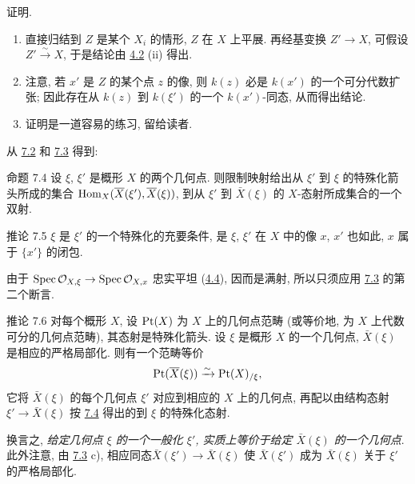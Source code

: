 证明.
\begin{enumerate}
\renewcommand{\theenumi}{\alph{enumi}}
\renewcommand{\labelenumi}{\theenumi)}
\item 直接归结到 $Z$ 是某个 $X_{i}$ 的情形,
\ie $Z$ 在 $X$ 上平展.
再经基变换 $Z'\to X$, 可假设 $Z'\xrightarrow{\sim} X$,
于是结论由 \hyperref[VIII.def4.2]{4.2} (ii) 得出.

\item 注意, 若 $x'$ 是 $Z$ 的某个点 $z$ 的像,
则 $k(z)$ 必是 $k(x')$ 的一个可分代数扩张;
因此存在从 $k(z)$ 到 $k(\xi')$ 的一个 $k(x')$-同态, 从而得出结论.

\item 证明\pageoriginale 是一道容易的练习, 留给读者.
\end{enumerate}

从 \hyperref[VIII.def7.2]{7.2} 和 \hyperref[VIII.lem7.3]{7.3} 得到:

\begin{enonce*}{命题 7.4}
设 $\xi$, $\xi'$ 是概形 $X$ 的两个几何点.
则限制映射给出从 $\xi'$ 到 $\xi$ 的特殊化箭头所成的集合
$\operatorname{Hom}_{X} (\overline{X}(\xi'), \overline{X}(\xi))$,
到从 $\xi'$ 到 $\bar{X}(\xi)$ 的 $X$-态射所成集合的一个双射.
\end{enonce*}

\begin{enonce*}{推论 7.5}
$\xi$ 是 $\xi'$ 的一个特殊化的充要条件,
是 $\xi$, $\xi'$ 在 $X$ 中的像 $x$, $x'$ 也如此,
\ie $x$ 属于 $\{x'\}$ 的闭包.
\end{enonce*}

由于 $\Spec \Oo_{X, \xi} \to \Spec \Oo_{X, x}$ 忠实平坦
(\hyperref[VIII.subsec4.4]{4.4}), 因而是满射,
所以只须应用 \hyperref[VIII.lem7.3]{7.3} 的第二个断言.

\begin{enonce*}{推论 7.6}
对每个概形 $X$,
设 $\protect\mathcal{\operatorname{Pt}}(X)$ 为 $X$ 上的几何点范畴
(或等价地, 为 $X$ 上代数可分的几何点范畴), 其态射是特殊化箭头.
设 $\xi$ 是概形 $X$ 的一个几何点,
$\bar{X}(\xi)$ 是相应的严格局部化.
则有一个范畴等价
$$
\protect\mathcal{\operatorname{Pt}}(\overline{X}(\xi)) \xrightarrow{\sim} \protect\mathcal{\operatorname{Pt}}(X)_{/\xi}{},
$$
它将 $\bar{X}(\xi)$ 的每个几何点 $\xi'$
对应到相应的 $X$ 上的几何点,
再配以由结构态射 $\xi' \to \bar{X}(\xi)$
按 \hyperref[VIII.prop7.4]{7.4} 得出的到 $\xi$ 的特殊化态射.
\end{enonce*}

换言之, \emph{给定几何点 $\xi$ 的一个一般化 $\xi'$,
实质上等价于给定 $\bar{X}(\xi)$ 的一个几何点}.
此外注意, 由 \hyperref[VIII.lem7.3]{7.3} c),
相应同态\pageoriginale $\bar{X}(\xi') \to \bar{X}(\xi)$
使 $\bar{X}(\xi')$ 成为 $\bar{X}(\xi)$ 关于 $\xi'$ 的严格局部化.

